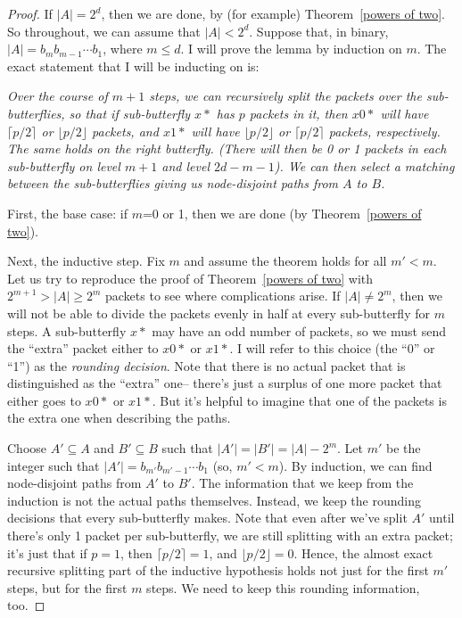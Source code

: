\documentclass[12pt]{article}
\begin{document}
\begin{proof}
If $|A| = 2^{d}$, then we are done, by (for example) 
Theorem~\ref{powers of two}.  So throughout, we can assume that
$|A| < 2^{d}$.
Suppose that, in binary, $|A|=b_{m}b_{m-1}\cdots b_{1}$, where
$m\leq d$.  I will prove the lemma by induction on $m$.
The exact statement that I will be inducting on is: 

\emph{
Over the course of $m+1$ steps, 
we can recursively split the packets over the sub-butterflies, 
so that if sub-butterfly $x*$ has $p$ packets in it, then $x0*$ will
have $\lceil p/2 \rceil$ or $\lfloor p/2 \rfloor$ packets, and $x1*$ will
have $\lfloor p/2 \rfloor$ or $\lceil p/2 \rceil$ packets, respectively.
The same holds on the right butterfly.
(There will then be 0 or 1 packets in each sub-butterfly on level $m+1$
and level $2d-m-1$).  We can then select a matching between the 
sub-butterflies giving us node-disjoint paths from $A$ to $B$.
}


First, the base case: if $m$=0 or 1, then we are done (by 
Theorem~\ref{powers of two}).

Next, the inductive step.  Fix $m$ and assume the theorem holds
for all $m'<m$.  Let us try to reproduce the proof of 
Theorem~\ref{powers of two} with $2^{m+1}>|A| \geq 2^{m}$ 
packets to see where complications arise.  If $|A|\neq 2^{m}$, then
we will not be able to divide the packets evenly in half at every
sub-butterfly for $m$ steps.  A sub-butterfly $x*$ may have an odd number of
packets, so we must send the ``extra'' packet either to $x0*$ or $x1*$.
I will refer to this choice (the ``0'' or ``1'') as the \emph{rounding
decision}.  Note that there is no actual packet that is distinguished
as the ``extra'' one-- there's just a surplus of one more packet that
either goes to $x0*$ or $x1*$.  But it's helpful to imagine that one
of the packets is the extra one when describing the paths.

Choose $A' \subseteq A$ and $B' \subseteq B$ such that
$|A'|=|B'|=|A|-2^{m}$.   Let $m'$ be the integer such that 
$|A'|=b_{m'}b_{m'-1}\cdots b_{1}$ (so, $m'<m$).  
By induction, we can find node-disjoint paths
from $A'$ to $B'$.  The information that we keep from the
induction is not the actual paths themselves.
Instead, we keep the rounding decisions that every sub-butterfly
makes.  Note that even after
we've split $A'$ until there's only 1 packet per sub-butterfly,
we are still splitting with an extra packet; it's just that if
$p=1$, then $\lceil p/2 \rceil =1$, and $\lfloor p/2 \rfloor=0$.
Hence, the almost exact recursive splitting part of the inductive
hypothesis holds not just for the first $m'$ steps, but for the
first $m$ steps.  We need to keep this rounding
information, too.


\end{proof}
\end{document}
